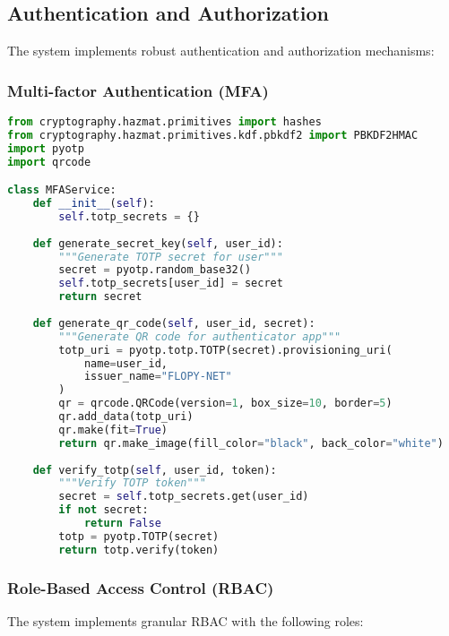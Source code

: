 \subsection{Authentication and Authorization}

The system implements robust authentication and authorization mechanisms:

\subsubsection{Multi-factor Authentication (MFA)}
\begin{lstlisting}[language=python, caption=MFA Implementation]
from cryptography.hazmat.primitives import hashes
from cryptography.hazmat.primitives.kdf.pbkdf2 import PBKDF2HMAC
import pyotp
import qrcode

class MFAService:
    def __init__(self):
        self.totp_secrets = {}
        
    def generate_secret_key(self, user_id):
        """Generate TOTP secret for user"""
        secret = pyotp.random_base32()
        self.totp_secrets[user_id] = secret
        return secret
        
    def generate_qr_code(self, user_id, secret):
        """Generate QR code for authenticator app"""
        totp_uri = pyotp.totp.TOTP(secret).provisioning_uri(
            name=user_id,
            issuer_name="FLOPY-NET"
        )
        qr = qrcode.QRCode(version=1, box_size=10, border=5)
        qr.add_data(totp_uri)
        qr.make(fit=True)
        return qr.make_image(fill_color="black", back_color="white")
        
    def verify_totp(self, user_id, token):
        """Verify TOTP token"""
        secret = self.totp_secrets.get(user_id)
        if not secret:
            return False
        totp = pyotp.TOTP(secret)
        return totp.verify(token)
\end{lstlisting}

\subsubsection{Role-Based Access Control (RBAC)}
The system implements granular RBAC with the following roles:

